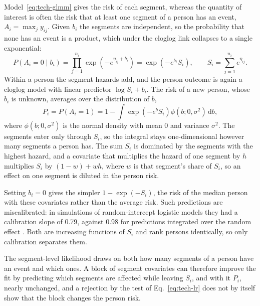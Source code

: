 Model~\eqref{eq:tech-glmm} gives the risk of each segment, whereas the quantity of interest is often the risk that at least one segment of a person has an event, $A_i = \max_j y_{ij}$.
Given $b_i$ the segments are independent, so the probability that none has an event is a product, which under the cloglog link collapses to a single exponential:
\begin{equation}
  P(A_i = 0 \mid b_i) = \prod_{j=1}^{n_i} \exp\!\left(-e^{\eta_{ij} + b_i}\right)
  = \exp\!\left(-e^{b_i} S_i\right),
  \qquad
  S_i = \sum_{j=1}^{n_i} e^{\eta_{ij}} .
  \label{eq:tech-agg-conditional}
\end{equation}
Within a person the segment hazards add, and the person outcome is again a cloglog model with linear predictor $\log S_i + b_i$.
The risk of a new person, whose $b_i$ is unknown, averages over the distribution of $b$,
\begin{equation}
  P_i = P(A_i = 1) = 1 - \int \exp\!\left(-e^{b} S_i\right) \phi(b; 0, \sigma^2)\,\mathrm{d}b ,
  \label{eq:tech-agg-marginal}
\end{equation}
where $\phi(b; 0, \sigma^2)$ is the normal density with mean 0 and variance $\sigma^2$.
The segments enter only through $S_i$, so the integral stays one-dimensional however many segments a person has.
The sum $S_i$ is dominated by the segments with the highest hazard, and a covariate that multiplies the hazard of one segment by $h$ multiplies $S_i$ by $(1 - w) + w h$, where $w$ is that segment's share of $S_i$, so an effect on one segment is diluted in the person risk.

Setting $b_i = 0$ gives the simpler $1 - \exp(-S_i)$, the risk of the median person with these covariates rather than the average risk.
Such predictions are miscalibrated: in simulations of random-intercept logistic models they had a calibration slope of 0.79, against 0.98 for predictions integrated over the random effect \cite{pavlou2015marginal}.
Both are increasing functions of $S_i$ and rank persons identically, so only calibration separates them.

The segment-level likelihood draws on both how many segments of a person have an event and which ones.
A block of segment covariates can therefore improve the fit by predicting which segments are affected while leaving $S_i$, and with it $P_i$, nearly unchanged, and a rejection by the test of Eq.~\eqref{eq:tech-lr} does not by itself show that the block changes the person risk.
